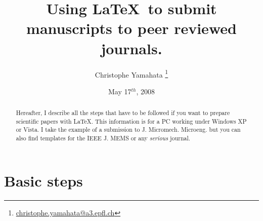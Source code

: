 \documentclass[a4paper]{article}
\title{Using \LaTeX\ to submit manuscripts to peer reviewed journals.}
\author{Christophe Yamahata \footnote{\href{mailto:christophe.yamahata@a3.epfl.ch}{christophe.yamahata@a3.epfl.ch}}}
\date{May 17$^{th}$, 2008}
\begin{document}
\maketitle

\begin{abstract}
Hereafter, I describe all the steps that have to  be followed if you want to 
prepare scientific papers with \LaTeX. This information is for a PC working 
under Windows XP or Vista. I take the example of a submission to 
J. Micromech. Microeng. but you can also find templates for the IEEE J. MEMS
or any \emph{serious} journal.
\end{abstract}


\section*{Basic steps}
\end{document}
